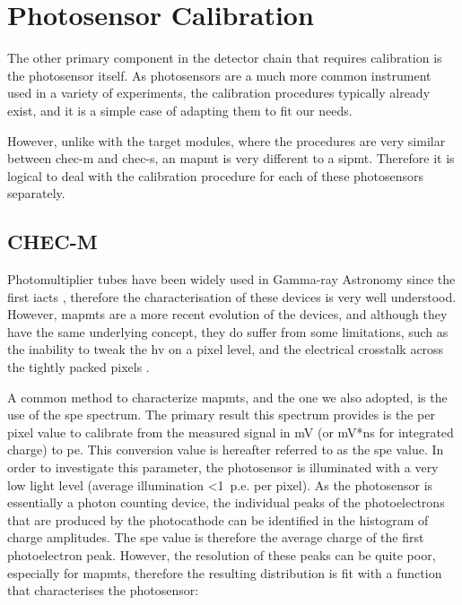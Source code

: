 
\section{Photosensor Calibration}

The other primary component in the detector chain that requires calibration is the photosensor itself. As photosensors are a much more common instrument used in a variety of experiments, the calibration procedures typically already exist, and it is a simple case of adapting them to fit our needs.

However, unlike with the \gls{target} modules, where the procedures are very similar between \gls{chec-m} and \gls{chec-s}, an \gls{mapmt} is very different to a \gls{sipmt}. Therefore it is logical to deal with the calibration procedure for each of these photosensors separately.

\subsection{CHEC-M}

Photomultiplier tubes have been widely used in Gamma-ray Astronomy since the first \glspl{iact} , therefore the characterisation of these devices is very well understood. However, \glspl{mapmt} are a more recent evolution of the devices, and although they have the same underlying concept, they do suffer from some limitations, such as the inability to tweak the \gls{hv} on a pixel level, and the electrical crosstalk across the tightly packed pixels .

A common method to characterize \glspl{mapmt}, and the one we also adopted, is the use of the \gls{spe} spectrum. The primary result this spectrum provides is the per pixel value to calibrate from the measured signal in mV (or mV*ns for integrated charge) to \gls{pe}. This conversion value is hereafter referred to as the \gls{spe} value. In order to investigate this parameter, the photosensor is illuminated with a very low light level (average illumination <1~p.e. per pixel). As the photosensor is essentially a photon counting device, the individual peaks of the photoelectrons that are produced by the photocathode can be identified in the histogram of charge amplitudes. The \gls{spe} value is therefore the average charge of the first photoelectron peak. However, the resolution of these peaks can be quite poor, especially for \glspl{mapmt}, therefore the resulting distribution is fit with a function that characterises the photosensor: 

